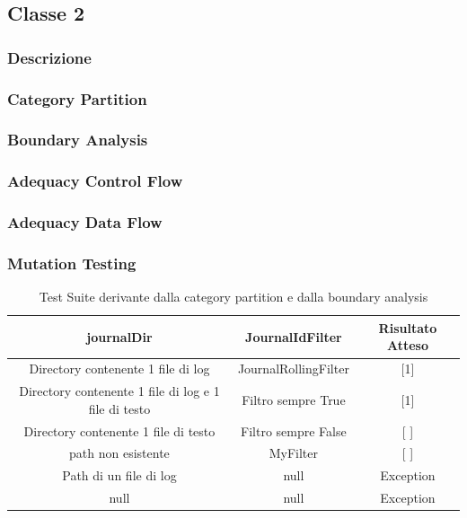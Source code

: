 \documentclass[12pt, a4paper]{article}
\begin{document}
\subsection{Classe 2}
\subsubsection{Descrizione}
\subsubsection{Category Partition}
\subsubsection{Boundary Analysis}
\subsubsection{Adequacy Control Flow}
\subsubsection{Adequacy Data Flow}
\subsubsection{Mutation Testing}














\begin{table}[ht]
  \centering
  \caption[Journal: Test Suite - Category Partition]{Test Suite derivante dalla category partition e dalla boundary analysis}
  \begin{tabular}{|c|c|c|}
  \hline
  journalDir & JournalIdFilter & Risultato Atteso \\
  \hline
  {Directory contenente 1 file di log} & JournalRollingFilter & [1] \\
  {Directory contenente 1 file di log e 1 file di testo} & Filtro sempre True & [1] \\
  {Directory contenente 1 file di testo} & Filtro sempre False & [ ] \\
  {path non esistente} & MyFilter & [ ] \\
  {Path di un file di log} & null & Exception \\
  null & null & Exception \\
  \hline
  \end{tabular}
  \label{tab:categoryPartition1ListJournalIds}
\end{table}
\end{document}
